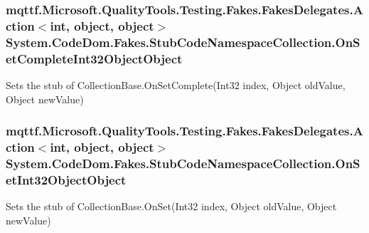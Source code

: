 \hypertarget{class_system_1_1_code_dom_1_1_fakes_1_1_stub_code_namespace_collection_a612312b37f5b9c7c5eb5484080e5e85b}{
\subsubsection[{On\-Set\-Complete\-Int32\-Object\-Object}]{\setlength{\rightskip}{0pt plus 5cm}mqttf.\-Microsoft.\-Quality\-Tools.\-Testing.\-Fakes.\-Fakes\-Delegates.\-Action$<$int, object, object$>$ System.\-Code\-Dom.\-Fakes.\-Stub\-Code\-Namespace\-Collection.\-On\-Set\-Complete\-Int32\-Object\-Object}}\label{class_system_1_1_code_dom_1_1_fakes_1_1_stub_code_namespace_collection_a612312b37f5b9c7c5eb5484080e5e85b}


Sets the stub of Collection\-Base.\-On\-Set\-Complete(\-Int32 index, Object old\-Value, Object new\-Value)

\hypertarget{class_system_1_1_code_dom_1_1_fakes_1_1_stub_code_namespace_collection_acc57af6ce29c1d996637cf0090a1cb8b}{
\subsubsection[{On\-Set\-Int32\-Object\-Object}]{\setlength{\rightskip}{0pt plus 5cm}mqttf.\-Microsoft.\-Quality\-Tools.\-Testing.\-Fakes.\-Fakes\-Delegates.\-Action$<$int, object, object$>$ System.\-Code\-Dom.\-Fakes.\-Stub\-Code\-Namespace\-Collection.\-On\-Set\-Int32\-Object\-Object}}\label{class_system_1_1_code_dom_1_1_fakes_1_1_stub_code_namespace_collection_acc57af6ce29c1d996637cf0090a1cb8b}


Sets the stub of Collection\-Base.\-On\-Set(\-Int32 index, Object old\-Value, Object new\-Value)

